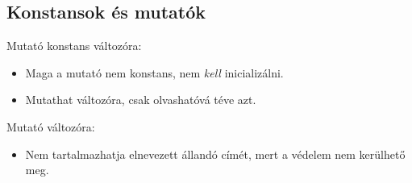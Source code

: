 \begin{frame}
    \begin{exampleblock}{}
        \scriptsize
        
    \end{exampleblock}
\end{frame}

\begin{frame}
    \begin{exampleblock}{}
        \scriptsize
        
    \end{exampleblock}
\end{frame}


\subsection{Konstansok és mutatók}

\begin{frame}
    Mutató konstans változóra:
    \begin{itemize}
        \item Maga a mutató nem konstans, nem \emph{kell} inicializálni.
        \item Mutathat változóra, csak olvashatóvá téve azt.
    \end{itemize}
    \begin{exampleblock}{}
        \scriptsize
        
    \end{exampleblock}
\end{frame}

\begin{frame}
    Mutató változóra:
    \begin{itemize}
        \item Nem tartalmazhatja elnevezett állandó címét, mert a védelem nem kerülhető meg.
    \end{itemize}
    \begin{exampleblock}{}
        \scriptsize
        
    \end{exampleblock}
\end{frame}

